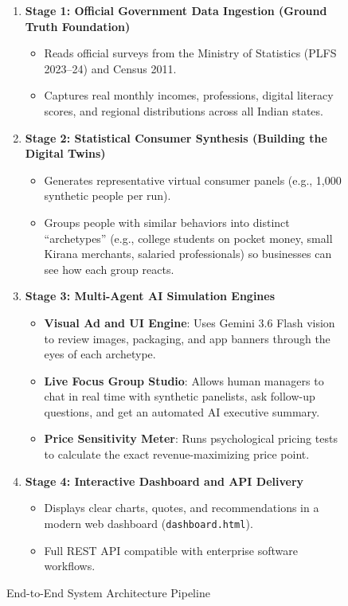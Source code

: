 \documentclass[11pt,a4paper]{article}
\begin{document}
\begin{figure}[htbp]
\centering
\begin{tcolorbox}[
  enhanced,
  colback=tblrowblue,
  colframe=tblheaderblue,
  arc=3mm,
  boxrule=1.2mm,
  title=\textbf{\color{white}\large System Architecture Pipeline},
  coltitle=white,
  attach boxed title to top left={xshift=5mm,yshift=-2.5mm},
  boxed title style={colback=tblheaderblue,colframe=tblheaderblue,arc=1.5mm}
]
\small
\begin{enumerate}[leftmargin=1.4em,itemsep=4pt]
  \item \textbf{Stage 1: Official Government Data Ingestion (Ground Truth Foundation)}
  \begin{itemize}[noitemsep]
    \item Reads official surveys from the Ministry of Statistics (PLFS 2023--24) and Census 2011.
    \item Captures real monthly incomes, professions, digital literacy scores, and regional distributions across all Indian states.
  \end{itemize}
  \item \textbf{Stage 2: Statistical Consumer Synthesis (Building the Digital Twins)}
  \begin{itemize}[noitemsep]
    \item Generates representative virtual consumer panels (e.g., 1,000 synthetic people per run).
    \item Groups people with similar behaviors into distinct ``archetypes'' (e.g., college students on pocket money, small Kirana merchants, salaried professionals) so businesses can see how each group reacts.
  \end{itemize}
  \item \textbf{Stage 3: Multi-Agent AI Simulation Engines}
  \begin{itemize}[noitemsep]
    \item \textbf{Visual Ad and UI Engine}: Uses Gemini 3.6 Flash vision to review images, packaging, and app banners through the eyes of each archetype.
    \item \textbf{Live Focus Group Studio}: Allows human managers to chat in real time with synthetic panelists, ask follow-up questions, and get an automated AI executive summary.
    \item \textbf{Price Sensitivity Meter}: Runs psychological pricing tests to calculate the exact revenue-maximizing price point.
  \end{itemize}
  \item \textbf{Stage 4: Interactive Dashboard and API Delivery}
  \begin{itemize}[noitemsep]
    \item Displays clear charts, quotes, and recommendations in a modern web dashboard (\texttt{dashboard.html}).
    \item Full REST API compatible with enterprise software workflows.
  \end{itemize}
\end{enumerate}
\end{tcolorbox}
\caption{End-to-End System Architecture Pipeline}
\label{fig:pipeline}
\end{figure}
\end{document}
